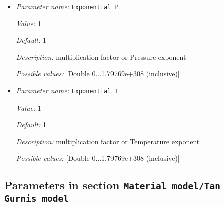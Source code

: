 \begin{itemize}
\item {\it Parameter name:} {\tt Exponential P}


{\it Value:} 1


{\it Default:} 1


{\it Description:} multiplication factor or Pressure exponent


{\it Possible values:} [Double 0...1.79769e+308 (inclusive)]
\item {\it Parameter name:} {\tt Exponential T}


{\it Value:} 1


{\it Default:} 1


{\it Description:} multiplication factor or Temperature exponent


{\it Possible values:} [Double 0...1.79769e+308 (inclusive)]
\end{itemize}

\subsection{Parameters in section \tt Material model/Tan Gurnis model}
\label{parameters:Material_20model/Tan_20Gurnis_20model}

